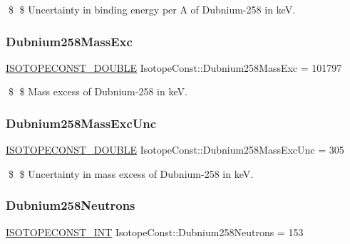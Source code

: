 \$ \$ Uncertainty in binding energy per A of Dubnium-\/258 in keV. \mbox{\label{group___isotope_const-_dubnium-_db258_ga6b77b25b2a214a3b6458e8feebdb8cda}} 
\subsubsection{\texorpdfstring{Dubnium258\+Mass\+Exc}{Dubnium258MassExc}}
{\footnotesize\ttfamily \mbox{\hyperlink{group___isotope_const-_macros_ga8f45a7272ce02c0b4c65c44636ed719a}{I\+S\+O\+T\+O\+P\+E\+C\+O\+N\+S\+T\+\_\+\+D\+O\+U\+B\+LE}} Isotope\+Const\+::\+Dubnium258\+Mass\+Exc = 101797}

\$ \$ Mass excess of Dubnium-\/258 in keV. \mbox{\label{group___isotope_const-_dubnium-_db258_ga3326b51a7b33c1ba546588d3d4eb8d47}} 
\subsubsection{\texorpdfstring{Dubnium258\+Mass\+Exc\+Unc}{Dubnium258MassExcUnc}}
{\footnotesize\ttfamily \mbox{\hyperlink{group___isotope_const-_macros_ga8f45a7272ce02c0b4c65c44636ed719a}{I\+S\+O\+T\+O\+P\+E\+C\+O\+N\+S\+T\+\_\+\+D\+O\+U\+B\+LE}} Isotope\+Const\+::\+Dubnium258\+Mass\+Exc\+Unc = 305}

\$ \$ Uncertainty in mass excess of Dubnium-\/258 in keV. \mbox{\label{group___isotope_const-_dubnium-_db258_ga0e6fe3f4e1e35cb831184ce910fb70ed}} 
\subsubsection{\texorpdfstring{Dubnium258\+Neutrons}{Dubnium258Neutrons}}
{\footnotesize\ttfamily \mbox{\hyperlink{group___isotope_const-_macros_ga5f18360b3e99483a35c32d789e62621c}{I\+S\+O\+T\+O\+P\+E\+C\+O\+N\+S\+T\+\_\+\+I\+NT}} Isotope\+Const\+::\+Dubnium258\+Neutrons = 153}

